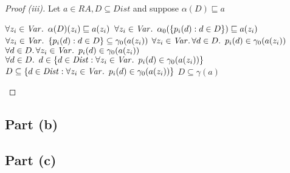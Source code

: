 \begin{prop}
  \begin{proof}[Proof (iii)]
    Let $a\in\mathit{RA},D\subseteq\mathit{Dist}$ and suppose $\alpha(D)\sqsubseteq a$
    \begin{itemize}
      \step[\iffs] $\forall z_i\in\mathit{Var}\ldotp~\alpha(D)(z_i)\sqsubseteq a(z_i)$
      \step[\iffs] $\forall z_i\in\mathit{Var}\ldotp~\alpha_0(\{p_i(d) : d\in D\})\sqsubseteq a(z_i)$
      \step[\iffs] $\forall z_i\in\mathit{Var}\ldotp~\{p_i(d) : d\in D\}\subseteq \gamma_0(a(z_i))$
      \step[\iffs] $\forall z_i\in\mathit{Var}\ldotp\forall d\in D\ldotp~p_i(d)\in\gamma_0(a(z_i))$
      \step[\iffs] $\forall d\in D\ldotp\forall z_i\in\mathit{Var}\ldotp~p_i(d)\in\gamma_0(a(z_i))$
      \step[\iffs] $\forall d\in D\ldotp~d\in\{d\in\mathit{Dist} : \forall z_i\in\mathit{Var}\ldotp~p_i(d)\in\gamma_0(a(z_i))\}$
      \step[\iffs] $D\subseteq\{d\in\mathit{Dist} : \forall z_i\in\mathit{Var}\ldotp~p_i(d)\in\gamma_0(a(z_i))\}$
      \step[\iffs] $D\subseteq\gamma(a)$\qedhere
    \end{itemize}
  \end{proof}
\end{prop}

\subsection{Part (b)}\label{sec:q-3-b}

\subsection{Part (c)}\label{sec:q-3-c}

